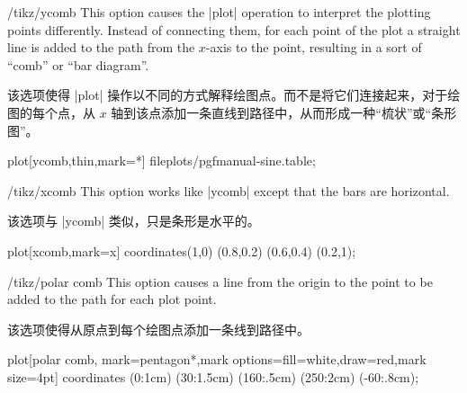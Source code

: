 \begin{key}{/tikz/ycomb}
    This option causes the |plot| operation to interpret the plotting points
    differently. Instead of connecting them, for each point of the plot a
    straight line is added to the path from the $x$-axis to the point,
    resulting in a sort of ``comb'' or ``bar diagram''.
    
    该选项使得 |plot| 操作以不同的方式解释绘图点。而不是将它们连接起来，对于绘图的每个点，从 $x$ 轴到该点添加一条直线到路径中，从而形成一种“梳状”或“条形图”。
\begin{codeexample}[]
\tikz{} plot[ycomb,thin,mark=*] file{plots/pgfmanual-sine.table};
\end{codeexample}

\begin{codeexample}[]
\end{codeexample}
\end{key}

\begin{key}{/tikz/xcomb}
    This option works like |ycomb| except that the bars are horizontal.
    
    该选项与 |ycomb| 类似，只是条形是水平的。
\begin{codeexample}[]
\tikz \draw plot[xcomb,mark=x] coordinates{(1,0) (0.8,0.2) (0.6,0.4) (0.2,1)};
\end{codeexample}
\end{key}

\begin{key}{/tikz/polar comb}
    This option causes a line from the origin to the point to be added to the
    path for each plot point.
    
    该选项使得从原点到每个绘图点添加一条线到路径中。
\begin{codeexample}[]
\tikz \draw plot[polar comb,
     mark=pentagon*,mark options={fill=white,draw=red},mark size=4pt]
   coordinates {(0:1cm) (30:1.5cm) (160:.5cm) (250:2cm) (-60:.8cm)};
\end{codeexample}
\end{key}

